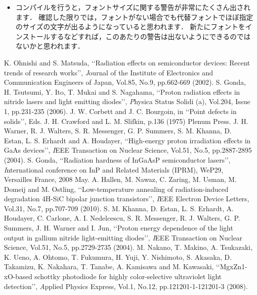 \documentclass{ujarticle}
\begin{document}
{\begin{multicols}{2}
\begin{itemize}
\item コンパイルを行うと，フォントサイズに関する警告が非常にたくさん出されます．
確認した限りでは，フォントがない場合でも代替フォントでほぼ指定のサイズの文字が出るようになっていると思われます．
新たにフォントをインストールするなどすれば，このあたりの警告は出ないようにできるのではないかと思われます．
\end{itemize}

\begin{thebibliography}{99}
 K. Ohnishi and S. Matsuda, \lq\lq Radiation effects on semiconductor devices: Recent trends of research works\rq\rq, {\textit Journal of the Institute of Electronics and Communication Engineers of Japan}, Vol.85, No.9, pp.662-669 (2002).
%
 S. Gonda, H. Tsutsumi, Y. Ito, T. Mukai and S. Nagahama, \lq\lq Proton radiation effects in nitride lasers and light emitting diodes\rq\rq, {\textit Physica Status Solidi (a)}, Vol.204, Issue 1, pp.231-235 (2006).
%
 J. W. Corbett and J. C. Bourgoin, in \lq\lq Point defects in solids\rq\rq , Eds. J. H. Crawford and L. M. Slifkin, p.136 (1975) Plenum Press.
%
 J. H. Warner, R. J. Walters, S. R. Messenger, G. P. Summers, S. M. Khanna, D. Estan, L. S. Erhardt and A. Houdayer, \lq\lq High-energy proton irradiation effects in GaAs devices\rq\rq, {\textit IEEE Transaction on Nuclear Science}, Vol.51, No.5, pp.2887-2895 (2004).
%
 S. Gonda, \lq\lq Radiation hardness of InGaAsP semiconductor lasers\rq\rq, {\textit International conference on InP and Related Materials (IPRM)}, WeP29, Versailles France, 2008 May.
%
 A. Hallen, M. Nawaz, C. Zaring, M. Usman, M. Domeij and M. Ostling, \lq\lq Low-temperature annealing of radiation-induced degradation 4H-SiC bipolar junction transistors\rq\rq, {\textit IEEE Electron Device Letters}, Vol.31, No.7, pp.707-709 (2010).
%
 S. M. Khanna, D. Estan, L. S. Erhardt, A. Houdayer, C. Carlone, A. I. Nedelcescu, S. R. Messenger, R. J. Walters, G. P. Summers, J. H. Warner and I. Jun, \lq\lq Proton energy dependence of the light output in gallium nitride light-emitting diodes\rq\rq, {\textit IEEE Transaction on Nuclear Science}, Vol.51, No.5, pp.2729-2735 (2004).
%
 M. Nakano, T. Makino, A. Tsukazaki, K. Ueno, A. Ohtomo, T. Fukumura, H. Yuji, Y. Nishimoto, S. Akasaka, D. Takamizu, K. Nakahara, T. Tanabe, A. Kamisawa and M. Kawasaki, \lq\lq MgxZn1-xO-based schottky photodiode for highly color-selective ultraviolet light detection\rq\rq, {\textit Applied Physics Express}, Vol.1, No.12, pp.121201-1-121201-3 (2008).

\end{thebibliography}
\end{multicols}}
\end{document}

